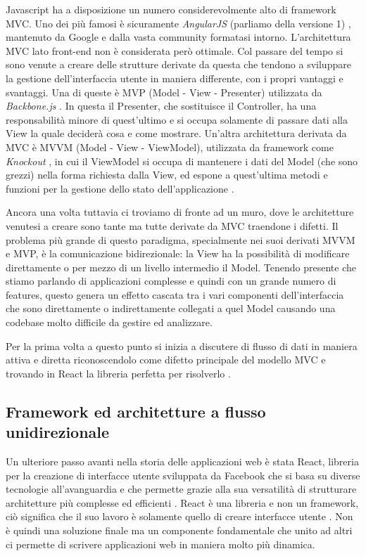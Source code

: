 Javascript ha a disposizione un numero considerevolmente alto di framework MVC. Uno dei più famosi è sicuramente \textit{AngularJS} (parliamo della versione 1) \cite{AngularOfficialDocumentation}, mantenuto da Google e dalla vasta community formatasi intorno.
L'architettura MVC lato front-end non è considerata però ottimale. Col passare del tempo si sono venute a creare delle strutture derivate da questa che tendono a sviluppare la gestione dell'interfaccia utente in maniera differente, con i propri vantaggi e svantaggi. Una di queste è MVP (Model - View - Presenter) utilizzata da \textit{Backbone.js} \cite{HerskovitsAngularVsBackbone}. In questa il Presenter, che sostituisce il Controller, ha una responsabilità minore di quest'ultimo e si occupa solamente di passare dati alla View la quale deciderà cosa e come mostrare. Un'altra architettura derivata da MVC è MVVM (Model - View - ViewModel), utilizzata da framework come \textit{Knockout} \cite{KnockoutOfficialDocumentation}, in cui il ViewModel si occupa di mantenere i dati del Model (che sono grezzi) nella forma richiesta dalla View, ed espone a quest'ultima metodi e funzioni per la gestione dello stato dell'applicazione \cite{ChauhanFrontendArchitectures}.

Ancora una volta tuttavia ci troviamo di fronte ad un muro, dove le architetture venutesi a creare sono tante ma tutte derivate da MVC traendone i difetti. Il problema più grande di questo paradigma, specialmente nei suoi derivati MVVM e MVP, è la comunicazione bidirezionale: la View ha la possibilità di modificare direttamente o per mezzo di un livello intermedio il Model. Tenendo presente che stiamo parlando di applicazioni complesse e quindi con un grande numero di features, questo genera un effetto cascata tra i vari componenti dell'interfaccia che sono direttamente o indirettamente collegati a quel Model causando una codebase molto difficile da gestire ed analizzare. 

Per la prima volta a questo punto si inizia a discutere di flusso di dati in maniera attiva e diretta riconoscendolo come difetto principale del modello MVC e trovando in React la libreria perfetta per risolverlo \cite{SalihefendicFluxVsMVC}.

\subsection{Framework ed architetture a flusso unidirezionale}
Un ulteriore passo avanti nella storia delle applicazioni web è stata React, libreria per la creazione di interfacce utente sviluppata da Facebook che si basa su diverse tecnologie all'avanguardia e che permette grazie alla sua versatilità di strutturare architetture più complesse ed efficienti \cite{ReactOfficialWebsite}.
React è una libreria e non un framework, ciò significa che il suo lavoro è solamente quello di creare interfacce utente \cite{BunaReactIsTheNewFrontend}. Non è quindi una soluzione finale ma un componente fondamentale che unito ad altri ci permette di scrivere applicazioni web in maniera molto più dinamica.

